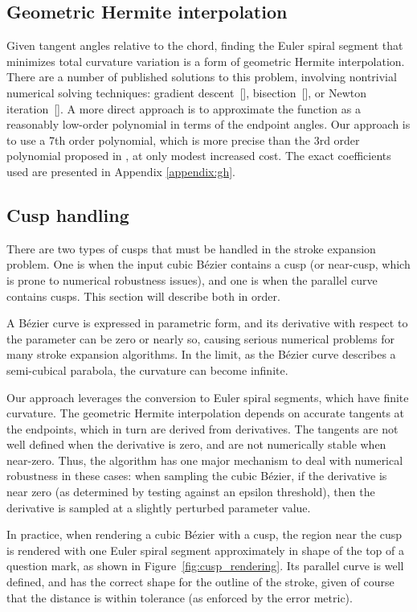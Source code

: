 \documentclass[sigconf, nonacm]{acmart}
\begin{document}
\subsection{Geometric Hermite interpolation}

Given tangent angles relative to the chord, finding the Euler spiral segment that minimizes total curvature variation is a form of geometric Hermite interpolation. There are a number of published solutions to this problem, involving nontrivial numerical solving techniques: gradient descent~[], bisection~[], or Newton iteration~[]. A more direct approach is to approximate the function as a reasonably low-order polynomial in terms of the endpoint angles. Our approach is to use a 7th order polynomial, which is more precise than the 3rd order polynomial proposed in \citet{Reif2021}, at only modest increased cost. The exact coefficients used are presented in Appendix \ref{appendix:gh}.

\subsection{Cusp handling}

There are two types of cusps that must be handled in the stroke expansion problem. One is when the input cubic Bézier contains a cusp (or near-cusp, which is prone to numerical robustness issues), and one is when the parallel curve contains cusps. This section will describe both in order.

A Bézier curve is expressed in parametric form, and its derivative with respect to the parameter can be zero or nearly so, causing serious numerical problems for many stroke expansion algorithms. In the limit, as the Bézier curve describes a semi-cubical parabola, the curvature can become infinite.

Our approach leverages the conversion to Euler spiral segments, which have finite curvature. The geometric Hermite interpolation depends on accurate tangents at the endpoints, which in turn are derived from derivatives. The tangents are not well defined when the derivative is zero, and are not numerically stable when near-zero. Thus, the algorithm has one major mechanism to deal with numerical robustness in these cases: when sampling the cubic Bézier, if the derivative is near zero (as determined by testing against an epsilon threshold), then the derivative is sampled at a slightly perturbed parameter value.

In practice, when rendering a cubic Bézier with a cusp, the region near the cusp is rendered with one Euler spiral segment approximately in shape of the top of a question mark, as shown in Figure~\ref{fig:cusp_rendering}. Its parallel curve is well defined, and has the correct shape for the outline of the stroke, given of course that the distance is within tolerance (as enforced by the error metric).
\end{document}
